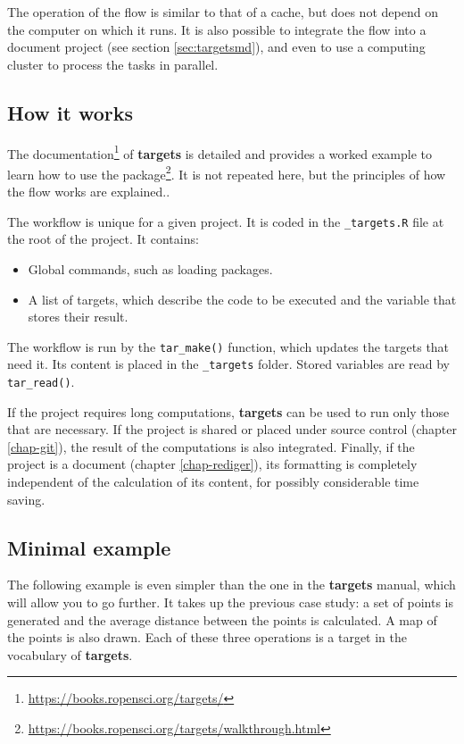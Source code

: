 \documentclass[
  12pt,
  american,
  a4paper,
  extrafontsizes,onecolumn,openright
  ]{memoir}
\providecommand{\tightlist}{%
  \setlength{\itemsep}{0pt}\setlength{\parskip}{0pt}}
\begin{document}
The operation of the flow is similar to that of a cache, but does not depend on the computer on which it runs.
It is also possible to integrate the flow into a document project (see section \ref{sec:targetsmd}), and even to use a computing cluster to process the tasks in parallel.

\hypertarget{how-it-works-1}{%
\subsection{How it works}\label{how-it-works-1}}

The documentation\footnote{\url{https://books.ropensci.org/targets/}} of \textbf{targets} is detailed and provides a worked example to learn how to use the package\footnote{\url{https://books.ropensci.org/targets/walkthrough.html}}.
It is not repeated here, but the principles of how the flow works are explained..

The workflow is unique for a given project.
It is coded in the \texttt{\_targets.R} file at the root of the project.
It contains:

\begin{itemize}
\tightlist
\item
  Global commands, such as loading packages.
\item
  A list of targets, which describe the code to be executed and the variable that stores their result.
\end{itemize}

The workflow is run by the \texttt{tar\_make()} function, which updates the targets that need it.
Its content is placed in the \texttt{\_targets} folder.
Stored variables are read by \texttt{tar\_read()}.

If the project requires long computations, \textbf{targets} can be used to run only those that are necessary.
If the project is shared or placed under source control (chapter \ref{chap-git}), the result of the computations is also integrated.
Finally, if the project is a document (chapter \ref{chap-rediger}), its formatting is completely independent of the calculation of its content, for possibly considerable time saving.

\hypertarget{minimal-example}{%
\subsection{Minimal example}\label{minimal-example}}

The following example is even simpler than the one in the \textbf{targets} manual, which will allow you to go further.
It takes up the previous case study: a set of points is generated and the average distance between the points is calculated.
A map of the points is also drawn.
Each of these three operations is a target in the vocabulary of \textbf{targets}.
\end{document}
